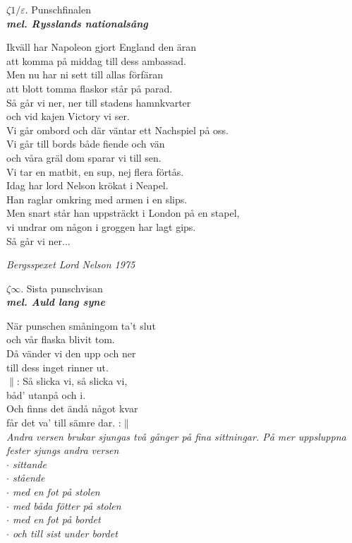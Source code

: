 \documentclass[a6paper,10pt]{article}
\newcommand{\mel}[1]{\small\textbf{\textit{mel. #1 \\}}}
\begin{document}
\setlength{\oddsidemargin}{-0.37in}
\noindent
\begin{center}
\Large $\zeta1/\varepsilon$. Punschfinalen \\ 
\mel{Rysslands nationalsång}
\end{center}
Ikväll har Napoleon gjort England den äran\\
att komma på middag till dess ambassad.\\
Men nu har ni sett till allas förfäran\\
att blott tomma flaskor står på parad.
\vspace{5pt}\\
Så går vi ner, ner till stadens hamnkvarter\\
och vid kajen Victory vi ser.\\
Vi går ombord och där väntar ett Nachspiel på oss.\\
Vi går till bords både fiende och vän\\
och våra gräl dom sparar vi till sen.\\
Vi tar en matbit, en sup, nej flera förtås.
\vspace{5pt}\\
Idag har lord Nelson krökat i Neapel.\\
Han raglar omkring med armen i en slips.\\
Men snart står han uppsträckt i London på en stapel,\\
vi undrar om någon i groggen har lagt gips.
\vspace{5pt}\\
Så går vi ner...
\begin{flushright}
\textit{Bergsspexet Lord Nelson 1975}
\end{flushright}

\setlength{\oddsidemargin}{-0.47in}
\noindent
\begin{center}
\Large $\zeta\infty$. Sista punschvisan \\ 
\mel{Auld lang syne}
\end{center}
När punschen småningom ta't slut\\
och vår flaska blivit tom.\\
Då vänder vi den upp och ner\\
till dess inget rinner ut.
\vspace{5pt}\\
$\|$: Så slicka vi, så slicka vi,\\
båd' utanpå och i.\\
Och finns det ändå något kvar\\
får det va' till sämre dar. :$\|$
\vspace{10pt}\\
\textit{Andra versen brukar sjungas två gånger på fina sittningar. På mer uppsluppna fester sjungs andra versen\\
$\cdot$ sittande\\
$\cdot$ stående\\
$\cdot$ med en fot på stolen\\
$\cdot$ med båda fötter på stolen\\
$\cdot$ med en fot på bordet\\
$\cdot$ och till sist under bordet}
\end{document}
